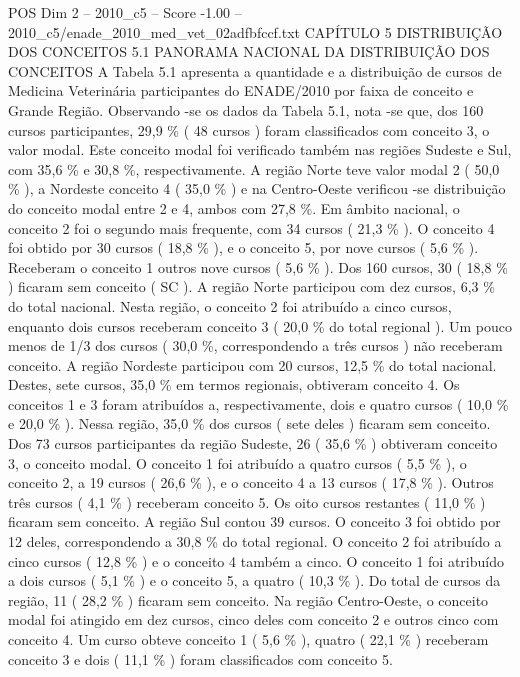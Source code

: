 \begin{textsample}{POS Dim 2 – 2010\_c5 – Score -1.00 – 2010\_c5/enade\_2010\_med\_vet\_02adfbfccf.txt}  \label{ex:f2_pos_330}
CAPÍTULO 5 DISTRIBUIÇÃO DOS CONCEITOS 5.1 PANORAMA NACIONAL DA DISTRIBUIÇÃO DOS CONCEITOS A Tabela 5.1 apresenta a quantidade e a distribuição de cursos de Medicina Veterinária participantes do ENADE/2010 por faixa de conceito e Grande Região.
Observando -se os dados da Tabela 5.1, nota -se que, dos 160 cursos participantes, 29,9 \% ( 48 cursos ) foram classificados com conceito 3, o valor modal.
Este conceito modal foi verificado também nas regiões Sudeste e Sul, com 35,6 \% e 30,8 \%, respectivamente.
A região Norte teve valor modal 2 ( 50,0 \% ), a Nordeste conceito 4 ( 35,0 \% ) e na Centro-Oeste verificou -se distribuição do conceito modal entre 2 e 4, ambos com 27,8 \%.
Em âmbito nacional, o conceito 2 foi o segundo mais frequente, com 34 cursos ( 21,3 \% ).
O conceito 4 foi obtido por 30 cursos ( 18,8 \% ), e o conceito 5, por nove cursos ( 5,6 \% ).
Receberam o conceito 1 outros nove cursos ( 5,6 \% ).
Dos 160 cursos, 30 ( 18,8 \% ) ficaram sem conceito ( SC ).
A região Norte participou com dez cursos, 6,3 \% do total nacional.
Nesta região, o conceito 2 foi atribuído a cinco cursos, enquanto dois cursos receberam conceito 3 ( 20,0 \% do total regional ).
Um pouco menos de 1/3 dos cursos ( 30,0 \%, correspondendo a três cursos ) não receberam conceito.
A região Nordeste participou com 20 cursos, 12,5 \% do total nacional.
Destes, sete cursos, 35,0 \% em termos regionais, obtiveram conceito 4.
Os conceitos 1 e 3 foram atribuídos a, respectivamente, dois e quatro cursos ( 10,0 \% e 20,0 \% ).
Nessa região, 35,0 \% dos cursos ( sete deles ) ficaram sem conceito.
Dos 73 cursos participantes da região Sudeste, 26 ( 35,6 \% ) obtiveram conceito 3, o conceito modal.
O conceito 1 foi atribuído a quatro cursos ( 5,5 \% ), o conceito 2, a 19 cursos ( 26,6 \% ), e o conceito 4 a 13 cursos ( 17,8 \% ).
Outros três cursos ( 4,1 \% ) receberam conceito 5.
Os oito cursos restantes ( 11,0 \% ) ficaram sem conceito.
A região Sul contou 39 cursos.
O conceito 3 foi obtido por 12 deles, correspondendo a 30,8 \% do total regional.
O conceito 2 foi atribuído a cinco cursos ( 12,8 \% ) e o conceito 4 também a cinco.
O conceito 1 foi atribuído a dois cursos ( 5,1 \% ) e o conceito 5, a quatro ( 10,3 \% ).
Do total de cursos da região, 11 ( 28,2 \% ) ficaram sem conceito.
Na região Centro-Oeste, o conceito modal foi atingido em dez cursos, cinco deles com conceito 2 e outros cinco com conceito 4.
Um curso obteve conceito 1 ( 5,6 \% ), quatro ( 22,1 \% ) receberam conceito 3 e dois ( 11,1 \% ) foram classificados com conceito 5.

\end{textsample}
